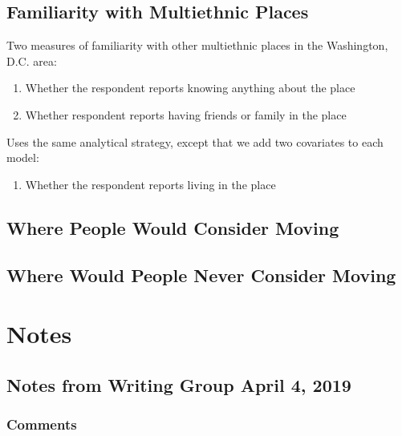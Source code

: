 \documentclass{baderart}
\providecommand{\tightlist}{%
  \setlength{\itemsep}{0pt}\setlength{\parskip}{0pt}}
\begin{document}
\subsection{Familiarity with Multiethnic Places}\label{familiarity-with-multiethnic-places}

Two measures of familiarity with other multiethnic places in the Washington, D.C. area:

\begin{enumerate} \def\labelenumi{\arabic{enumi}.} \tightlist \item   Whether the respondent reports knowing anything about the place \item   Whether respondent reports having friends or family in the place \end{enumerate}

Uses the same analytical strategy, except that we add two covariates to each model:

\begin{enumerate} \def\labelenumi{\arabic{enumi}.} \tightlist \item   Whether the respondent reports living in the place \end{enumerate}

\subsection{Where People Would Consider Moving}\label{where-people-would-consider-moving}

\subsection{Where Would People Never Consider Moving}\label{where-would-people-never-consider-moving}

\section{Notes}\label{notes}

\subsection{Notes from Writing Group April 4, 2019}\label{notes-from-writing-group-april-4-2019}

\subsubsection{Comments}\label{comments}
\end{document}

